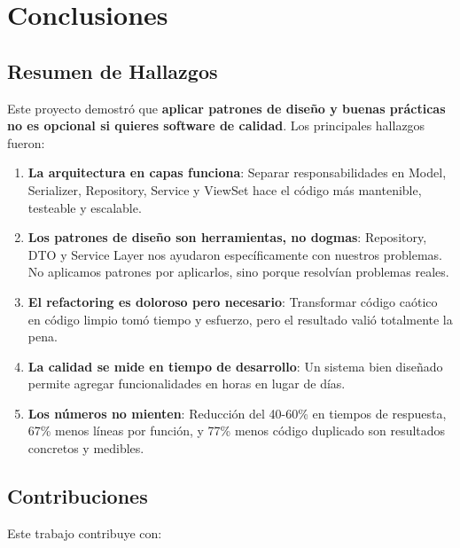 \section{Conclusiones}

\subsection{Resumen de Hallazgos}

Este proyecto demostró que \textbf{aplicar patrones de diseño y buenas prácticas no es opcional si quieres software de calidad}. Los principales hallazgos fueron:

\begin{enumerate}
    \item \textbf{La arquitectura en capas funciona}: Separar responsabilidades en Model, Serializer, Repository, Service y ViewSet hace el código más mantenible, testeable y escalable.
    
    \item \textbf{Los patrones de diseño son herramientas, no dogmas}: Repository, DTO y Service Layer nos ayudaron específicamente con nuestros problemas. No aplicamos patrones por aplicarlos, sino porque resolvían problemas reales.
    
    \item \textbf{El refactoring es doloroso pero necesario}: Transformar código caótico en código limpio tomó tiempo y esfuerzo, pero el resultado valió totalmente la pena.
    
    \item \textbf{La calidad se mide en tiempo de desarrollo}: Un sistema bien diseñado permite agregar funcionalidades en horas en lugar de días.
    
    \item \textbf{Los números no mienten}: Reducción del 40-60\% en tiempos de respuesta, 67\% menos líneas por función, y 77\% menos código duplicado son resultados concretos y medibles.
\end{enumerate}

\subsection{Contribuciones}

Este trabajo contribuye con:

